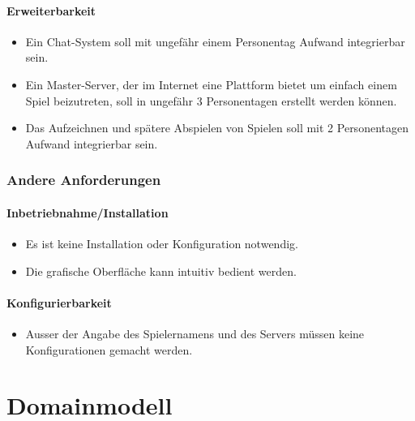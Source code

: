 \documentclass[a4paper,12pt,halfparskip,DIV14]{scrartcl}
\begin{document}
\paragraph{Erweiterbarkeit}\label{ssub:erweiterbarkeit} %

\begin{itemize}
	\item Ein Chat-System soll mit ungefähr einem Personentag Aufwand integrierbar sein.
	\item Ein Master-Server, der im Internet eine Plattform bietet um einfach einem Spiel beizutreten, soll in ungefähr 3 Personentagen erstellt werden können.
	\item Das Aufzeichnen und spätere Abspielen von Spielen soll mit 2 Personentagen Aufwand integrierbar sein.
\end{itemize}

\subsubsection{Andere Anforderungen}\label{ssub:andere_anforderungen} %
\paragraph{Inbetriebnahme/Installation}\label{ssub:inbetriebnahme_installation} %
\begin{itemize}
	\item Es ist keine Installation oder Konfiguration notwendig.
	\item Die grafische Oberfläche kann intuitiv bedient werden.
\end{itemize}
\paragraph{Konfigurierbarkeit}\label{ssub:konfigurierbarkeit} %
\begin{itemize}
	\item Ausser der Angabe des Spielernamens und des Servers müssen keine Konfigurationen gemacht werden.
\end{itemize}

\newpage

\section{Domainmodell}\label{cha:domainmodell} %
\end{document}
